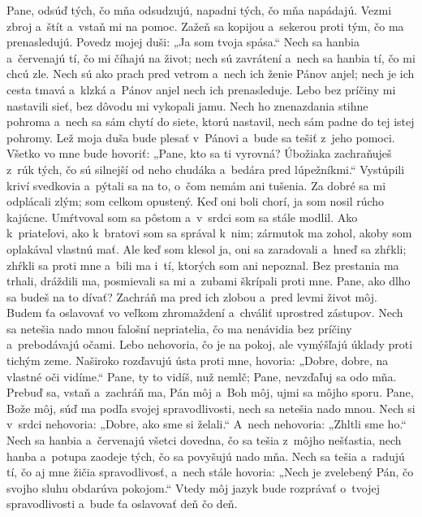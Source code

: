 Pane, odsúď tých, čo mňa odsudzujú,
napadni tých, čo mňa napádajú.
\versseparator
Vezmi zbroj a~štít
a~vstaň mi na pomoc.
\versseparator
Zažeň sa kopijou a~sekerou
proti tým, čo ma prenasledujú.
Povedz mojej duši: „Ja som tvoja spása.“
\versseparator
Nech sa hanbia a~červenajú tí,
čo mi číhajú na život;
\versseparator
nech sú zavrátení a~nech sa hanbia tí,
čo mi chcú zle.
\versseparator
Nech sú ako prach pred vetrom
a~nech ich ženie Pánov anjel;
\versseparator
nech je ich cesta tmavá a~klzká
a~Pánov anjel nech ich prenasleduje.
\versseparator
Lebo bez príčiny mi nastavili sieť,
bez dôvodu mi vykopali jamu.
\versseparator
Nech ho znenazdania stihne pohroma
a~nech sa sám chytí do siete, ktorú nastavil,
nech sám padne do tej istej pohromy.
\versseparator
Lež moja duša bude plesať v~Pánovi
a~bude sa tešiť z~jeho pomoci.
\versseparator
Všetko vo mne bude hovoriť:
„Pane, kto sa ti vyrovná?
\versseparator
Úbožiaka zachraňuješ z~rúk tých, čo sú silnejší od neho
chudáka a~bedára pred lúpežníkmi.“
\versseparator
Vystúpili kriví svedkovia
a~pýtali sa na to, o~čom nemám ani tušenia.
\versseparator
Za dobré sa mi odplácali zlým;
som celkom opustený.
\versseparator
Keď oni boli chorí,
ja som nosil rúcho kajúcne.
\versseparator
Umŕtvoval som sa pôstom
a~v~srdci som sa stále modlil.
\versseparator
Ako k~priateľovi, ako k~bratovi som sa správal k~nim;
zármutok ma zohol, akoby som oplakával vlastnú mať.
\versseparator
Ale keď som klesol ja, oni sa zaradovali a~hneď sa zhŕkli;
zhŕkli sa proti mne a~bili ma i~tí, ktorých som ani nepoznal.
\versseparator
Bez prestania ma trhali,
dráždili ma, posmievali sa mi
a~zubami škrípali proti mne.
\versseparator
Pane, ako dlho sa budeš na to dívať?
Zachráň ma pred ich zlobou
a~pred levmi život môj.
\versseparator
Budem ťa oslavovať vo veľkom zhromaždení
a~chváliť uprostred zástupov.
\versseparator
Nech sa netešia nado mnou falošní nepriatelia,
čo ma nenávidia bez príčiny a~prebodávajú očami.
\versseparator
Lebo nehovoria, čo je na pokoj,
ale vymýšľajú úklady proti tichým zeme.
\versseparator
Naširoko rozďavujú ústa proti mne,
hovoria: „Dobre, dobre, na vlastné oči vidíme.“
\versseparator
Pane, ty to vidíš, nuž nemlč;
Pane, nevzďaľuj sa odo mňa.
\versseparator
Prebuď sa, vstaň a~zachráň ma,
Pán môj a~Boh môj, ujmi sa môjho sporu.
\versseparator
Pane, Bože môj, súď ma podľa svojej spravodlivosti,
nech sa netešia nado mnou.
\versseparator
Nech si v~srdci nehovoria:
„Dobre, ako sme si želali.“
A~nech nehovoria: „Zhltli sme ho.“
\versseparator
Nech sa hanbia a~červenajú všetci dovedna,
čo sa tešia z~môjho nešťastia,
\versseparator
nech hanba a~potupa zaodeje tých,
čo sa povyšujú nado mňa.
\versseparator
Nech sa tešia a~radujú tí, čo aj mne žičia spravodlivosť,
a~nech stále hovoria: „Nech je zvelebený Pán,
čo svojho sluhu obdarúva pokojom.“
\versseparator
Vtedy môj jazyk bude rozprávať o~tvojej spravodlivosti
a~bude ťa oslavovať deň čo deň.